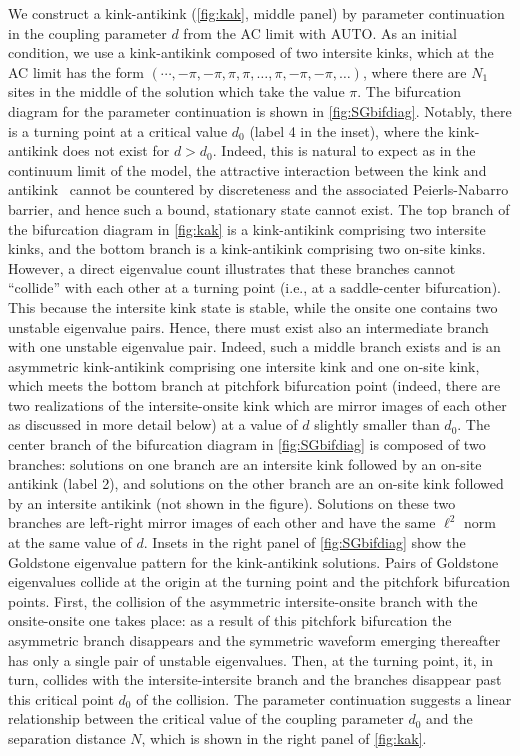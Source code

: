 \documentclass[12pt,reqno]{amsart}
\begin{document}
We construct a kink-antikink (\cref{fig:kak}, middle panel) by parameter continuation in the coupling parameter $d$ from the AC limit with AUTO. As an initial condition, we use a kink-antikink composed of two intersite kinks, which at the AC limit has the form $(\cdots, -\pi, -\pi, \pi, \pi, \dots, \pi, -\pi, -\pi, \dots )$, where there are $N_1$ sites in the middle of the solution which take the value $\pi$. The bifurcation diagram for the parameter continuation is shown in \cref{fig:SGbifdiag}. Notably, there is a turning point at a critical value $d_0$ (label 4 in the inset), where the kink-antikink does not exist for $d > d_0$. 
Indeed, this is natural to expect as in the continuum
limit of the model, the attractive interaction between the
kink and antikink~\cite{MANTON1979397} 
cannot be countered by discreteness and the associated
Peierls-Nabarro barrier, and hence such a bound, stationary
state cannot exist. 
The top branch of the bifurcation diagram in \cref{fig:kak} is a kink-antikink comprising two intersite kinks, and the bottom branch is a kink-antikink comprising two on-site kinks. 
However, a direct eigenvalue count illustrates that
these branches cannot ``collide'' with each other
at a turning point (i.e., at a saddle-center bifurcation). This
because the intersite kink state is stable, while the
onsite one contains two unstable eigenvalue pairs. Hence,
there must exist also an intermediate branch with one
unstable eigenvalue pair.
Indeed, such a  middle branch exists and is an asymmetric kink-antikink comprising one intersite kink and one on-site kink, which meets the bottom branch at pitchfork bifurcation point 
(indeed, there are two realizations of the 
intersite-onsite kink which are mirror images of each other as
discussed in more detail below) at a value of $d$ slightly smaller than $d_0$. The center branch of the bifurcation diagram in \cref{fig:SGbifdiag} is composed of two branches: solutions on one branch are an intersite kink followed by an on-site antikink (label 2), and solutions on the other branch are an on-site kink followed by an intersite antikink (not shown in the figure). Solutions on these two branches are left-right mirror images of each other and have the same $\ell^2$ norm at the same value of $d$. Insets in the right panel of \cref{fig:SGbifdiag} show the Goldstone eigenvalue pattern for the kink-antikink solutions. Pairs of Goldstone eigenvalues collide at the origin at the turning point and the pitchfork bifurcation points. 
First, the collision of the asymmetric intersite-onsite
branch with the onsite-onsite one takes place: as a result
of this pitchfork bifurcation the asymmetric branch disappears
and the symmetric waveform emerging thereafter has only
a single pair of unstable eigenvalues. Then, at the turning point,
it, in turn, collides with the intersite-intersite branch 
and the branches disappear past this critical
point $d_0$ of the collision.
The parameter continuation suggests a linear relationship between the critical value of the coupling parameter $d_0$ and the separation distance $N$, which is shown in the right panel of  \cref{fig:kak}.
\end{document}
